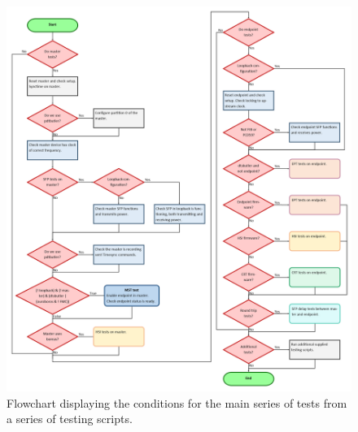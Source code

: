 \documentclass{dune}
\begin{document}
\begin{figure}[hb!]
\begin{center}
\includegraphics[width=\linewidth]{figures/flowchart-fdr-main.png}
\caption{Flowchart displaying the conditions for the main series of tests from a series of testing scripts.}
\label{fig:flowchart-main}
\end{center}
\end{figure}
\FloatBarrier
\end{document}
